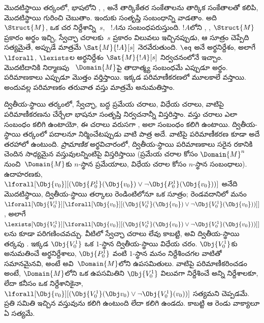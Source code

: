 \documentclass[../../../include/open-logic-section]{subfiles}
\begin{document}


మొదటిస్థాయి తర్కంలో, భాషలోని ,
,  అనే తార్కికేతర
సంకేతాలను తార్కిక సంకేతాలతో కలిపి, మొదటిస్థాయి 
గురించి చెబుతాం. ఇందుకు సంతృప్తి సంబంధాన్ని వాడతాం. అది
~$\Struct{M}$, ఒక చర నిర్దేశాన్ని~$s$, ~$!A$ను
సంబంధపరుస్తుంది. $!A$లోని ,
,  $\Struct{M}$ ప్రకారం
అర్థం ఇచ్చి, స్వేచ్ఛా చరాలకు~$s$ ప్రకారం విలువలు ఇచ్చినప్పుడు, ఆ సూత్రం
చెప్పేది సత్యమైతే, అప్పుడే మాత్రమే $\Sat{M}{!A}[s]$ నెరవేరుతుంది. $\eq$ అనే
 అర్థనిర్దేశం, అలాగే $\lforall$, $\lexists$ల
అర్థనిర్దేశం $\Sat{M}{!A}[s]$ నిర్వచనంలోనే ఇచ్చాం.
మొదటిదానికి నిర్మాణపు ~$\Domain{M}$పై తాదాత్మ్య
సంబంధమే ఎప్పుడూ అర్థం. పరిమాణకాలు ఎప్పుడూ మొత్తం
 వర్తిస్తాయి. ఇక్కడ పరిమాణీకరణలో
 మూలకాలే వస్తాయి.
అందువల్ల పరిమాణకం తరువాత వస్తు  మాత్రమే అనుమతిస్తాం.

ద్వితీయ-స్థాయి తర్కంలో, స్వేచ్ఛా, బద్ధ ప్రమేయ చరాలు, విధేయ చరాలు,
వాటిపై పరిమాణీకరణను చేర్చేలా భాషనూ సంతృప్తి నిర్వచనాన్నీ
విస్తరిస్తాం. వస్తు చరాలు  ఎలా సంబంధం కలిగి ఉంటాయో,
ఈ చరాలు వరుసగా , 
అలా సంబంధం కలిగి ఉంటాయి. ద్వితీయ-స్థాయి తర్కంలో పదాలనూ
 నిర్మించేటప్పుడు వాటి పాత్ర అదే. వాటిపై పరిమాణీకరణ కూడా
అదే తరహాలో ఉంటుంది.
\emph{ప్రామాణిక} అర్థవిచారంలో, ద్వితీయ-స్థాయి పరిమాణకాలు సరైన రకానికి
చెందిన సాధ్యమైన వస్తువులన్నింటిపై విస్తరిస్తాయి (ప్రమేయ చరాల కోసం
$\Domain{M}^n$ నుంచి~$\Domain{M}$కు $n$-స్థాన ప్రమేయాలు, విధేయ చరాల
కోసం $n$-స్థాన సంబంధాలు). ఉదాహరణకు,
$\lforall[\Obj{v_0}][(\Obj{P^1_0}(\Obj{v_0}) \lor \lnot
  \Obj{P^1_0}(\Obj{v_0}))]$ అనేది మొదటిస్థాయి, ద్వితీయ-స్థాయి
తర్కాలు రెండింటిలోనూ ఒక సూత్రం; రెండవదానిలో మనం
$\lforall[\Obj{V^1_0}][\lforall[\Obj{v_0}][(\Obj{V^1_0}(\Obj{v_0}) \lor
    \lnot \Obj{V^1_0}(\Obj{v_0}))]]$, అలాగే
$\lexists[\Obj{V^1_0}][\lforall[\Obj{v_0}][(\Obj{V^1_0}(\Obj{v_0}) \lor
    \lnot \Obj{V^1_0}(\Obj{v_0}))]]$లను కూడా పరిగణించవచ్చు. వీటిలో
స్వేచ్ఛా చరాలు లేవు కాబట్టి, అవి ద్వితీయ-స్థాయి తర్కపు
. ఇక్కడ $\Obj{V^1_0}$ ఒక $1$-స్థాన ద్వితీయ-స్థాయి విధేయ
చరం. $\Obj{V^1_0}$కు అనుమతించే అర్థనిర్దేశాలు, $\Obj{P^1_0}$ వంటి
$1$-స్థాన  మనం నిర్దేశించగల వాటితో సమానమైనవి, అంటే
అవి~$\Domain{M}$లోని ఉపసమితులు. వాటిపై పరిమాణీకరించడం అంటే,
$\Domain{M}$లోని ఒక ఉపసమితిని $\Obj{V^1_0}$ విలువగా నిర్దేశించే
అన్ని నిర్దేశాలకూ, లేదా కనీసం ఒక నిర్దేశానికైనా,
$\lforall[\Obj{v_0}][(\Obj{V^1_0}(\Obj v_0) \lor \lnot
  \Obj{V^1_0}(v_0))]$ సత్యమని చెప్పడమే. ప్రతి సమితి ఇచ్చిన వస్తువును
కలిగి ఉంటుంది లేదా కలిగి ఉండదు. కాబట్టి ఆ రెండు వాక్యాలూ ఏ
 సత్యమే.
\end{document}
